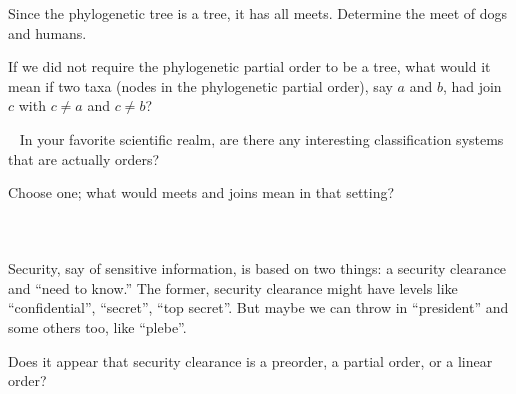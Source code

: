 \begin{blockRUS}
\end{blockRUS}

\begin{exerciseENG}
Since the phylogenetic tree is a tree, it has all meets.
\sexc Determine the meet of dogs and humans. 
\item If we did not require the phylogenetic partial order to be a tree, what would it mean if two taxa (nodes in the phylogenetic partial order), say $a$ and $b$, had join $c$ with $c\neq a$ and $c\neq b$?
\endsexc
\end{exerciseENG}

\begin{exerciseRUS}
\end{exerciseRUS}

\begin{exerciseENG}~
\sexc In your favorite scientific realm, are there any interesting classification systems that are actually orders? 
\item Choose one; what would meets and joins mean in that setting?
\endsexc
\end{exerciseENG}

\begin{exerciseRUS}~
\end{exerciseRUS}


\subsubsection{}

\begin{blockENG}
Security, say of sensitive information, is based on two things: a security clearance and “need to know.” The former, security clearance might have levels like “confidential”, “secret”, “top secret”. But maybe we can throw in “president” and some others too, like “plebe”. 
\end{blockENG}

\begin{blockRUS}
\end{blockRUS}

\begin{exerciseENG}
Does it appear that security clearance is a preorder, a partial order, or a linear order?
\end{exerciseENG}

\begin{exerciseRUS}
\end{exerciseRUS}

